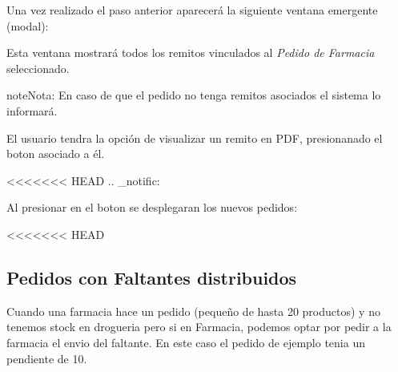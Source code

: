 \documentclass[a4paper,10pt,spanish]{sphinxmanual}
\begin{document}

Una vez realizado el paso anterior aparecerá la siguiente ventana emergente (modal):


Esta ventana mostrará todos los remitos vinculados al \emph{Pedido de Farmacia} seleccionado.

\begin{notice}{note}{Nota:}
En caso de que el pedido no tenga remitos asociados el sistema lo informará.
\end{notice}

El usuario tendra la opción de visualizar un remito en PDF, presionanado el boton  asociado a él.


\textless{}\textless{}\textless{}\textless{}\textless{}\textless{}\textless{} HEAD
.. \_notific:



Al presionar en el boton  se desplegaran los nuevos pedidos:


\textless{}\textless{}\textless{}\textless{}\textless{}\textless{}\textless{} HEAD


\subsection{Pedidos con Faltantes distribuidos}
\label{pedidosfarmacia:pedidos-con-faltantes-distribuidos}
Cuando una farmacia hace un pedido (pequeño de hasta 20 productos) y no tenemos stock en drogueria pero si en Farmacia, podemos optar por pedir a la farmacia el envio del faltante.
En este caso el pedido de ejemplo tenia un pendiente de 10.
\end{document}
